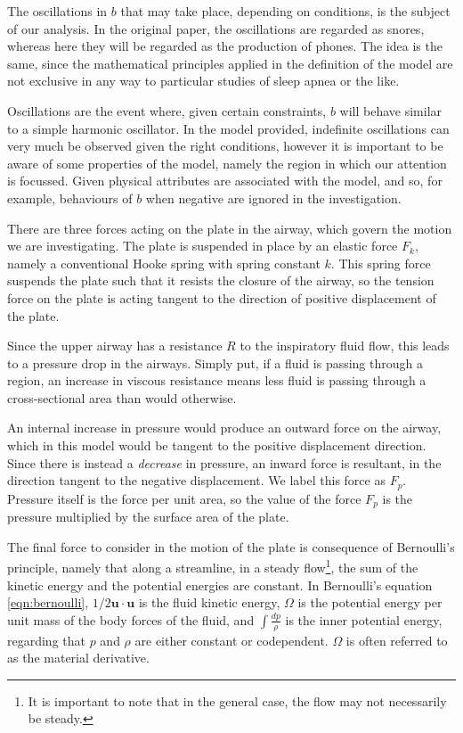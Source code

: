 \documentclass{article}
\begin{document}

The oscillations in $b$ that may take place, depending on conditions, is the subject of our analysis.
In the original paper, the oscillations are regarded as snores,
whereas here they will be regarded as the production of phones.
The idea is the same, since the mathematical principles applied in the definition of the model are not exclusive in any way to particular studies of sleep apnea or the like.

Oscillations are the event where, given certain constraints, $b$ will behave similar to a simple harmonic oscillator.
In the model provided, indefinite oscillations can very much be observed given the right conditions,
however it is important to be aware of some properties of the model,
namely the region in which our attention is focussed. Given physical attributes are associated with the model,
and so, for example, behaviours of $b$ when negative are ignored in the investigation.

There are three forces acting on the plate in the airway, which govern the motion we are investigating.
The plate is suspended in place by an elastic force $F_k$, namely a conventional Hooke spring with spring constant $k$.
This spring force suspends the plate such that it resists the closure of the airway,
so the tension force on the plate is acting tangent to the direction of positive displacement of the plate.


Since the upper airway has a resistance $R$ to the inspiratory fluid flow,
this leads to a pressure drop in the airways.
Simply put, if a fluid is passing through a region,
an increase in viscous resistance means less fluid is passing through a cross-sectional area than would otherwise.

An internal increase in pressure would produce an outward force on the airway,
which in this model would be tangent to the positive displacement direction.
Since there is instead a \textit{decrease} in pressure, an inward force is resultant,
in the direction tangent to the negative displacement. We label this force as $F_p$.
Pressure itself is the force per unit area,
so the value of the force $F_p$ is the pressure multiplied by the surface area of the plate.

The final force to consider in the motion of the plate is consequence of Bernoulli's principle,
namely that along a streamline, in a steady flow\footnote{It is important to note that in the general case, the flow may not necessarily be steady.}, 
the sum of the kinetic energy and the potential energies are constant.
In Bernoulli's equation \ref{eqn:bernoulli}, $1/2\mathbf{u}\cdot\mathbf{u}$ is the fluid kinetic energy,
$\Omega$ is the potential energy per unit mass of the body forces of the fluid,
and $\int\frac{dp}{\rho}$ is the inner potential energy, regarding that $p$ and $\rho$ are either constant or codependent.
$\Omega$ is often referred to as the material derivative.
\end{document}
